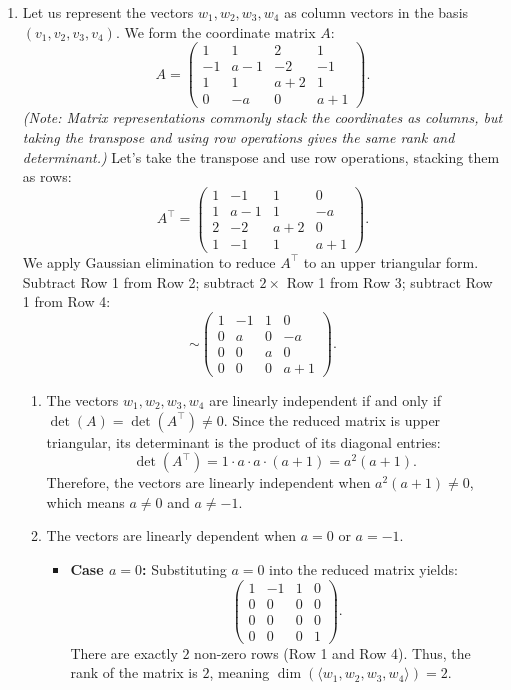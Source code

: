 \documentclass[10pt,a4paper]{article}
\begin{document}
\begin{enumerate}[label=\fbox{\arabic*}]
  \item %
        Let us represent the vectors $w_1, w_2, w_3, w_4$ as column vectors in the basis $(v_1, v_2, v_3, v_4)$. We form the coordinate matrix $A$:
        \[
          A = \begin{pmatrix} 1 & 1 & 2 & 1 \\ -1 & a-1 & -2 & -1 \\ 1 & 1 & a+2 & 1 \\ 0 & -a & 0 & a+1 \end{pmatrix}.
        \]
        \textit{(Note: Matrix representations commonly stack the coordinates as columns, but taking the transpose and using row operations gives the same rank and determinant.)} Let's take the transpose and use row operations, stacking them as rows:
        \[
          A^\top = \begin{pmatrix} 1 & -1 & 1 & 0 \\ 1 & a-1 & 1 & -a \\ 2 & -2 & a+2 & 0 \\ 1 & -1 & 1 & a+1 \end{pmatrix}.
        \]
        We apply Gaussian elimination to reduce $A^\top$ to an upper triangular form.
        Subtract Row 1 from Row 2; subtract $2 \times$ Row 1 from Row 3; subtract Row 1 from Row 4:
        \[
          \sim \begin{pmatrix} 1 & -1 & 1 & 0 \\ 0 & a & 0 & -a \\ 0 & 0 & a & 0 \\ 0 & 0 & 0 & a+1 \end{pmatrix}.
        \]
        \begin{enumerate}[label=(\arabic*)]
          \item The vectors $w_1, w_2, w_3, w_4$ are linearly independent if and only if $\det(A) = \det(A^\top) \neq 0$.
          Since the reduced matrix is upper triangular, its determinant is the product of its diagonal entries:
          \[
            \det(A^\top) = 1 \cdot a \cdot a \cdot (a+1) = a^2(a+1).
          \]
          Therefore, the vectors are linearly independent when $a^2(a+1) \neq 0$, which means $a \neq 0$ and $a \neq -1$.
          
          \item The vectors are linearly dependent when $a = 0$ or $a = -1$.
          \begin{itemize}
            \item \textbf{Case $a = 0$:} Substituting $a = 0$ into the reduced matrix yields:
            \[
              \begin{pmatrix} 1 & -1 & 1 & 0 \\ 0 & 0 & 0 & 0 \\ 0 & 0 & 0 & 0 \\ 0 & 0 & 0 & 1 \end{pmatrix}.
            \]
            There are exactly $2$ non-zero rows (Row 1 and Row 4). Thus, the rank of the matrix is $2$, meaning $\dim(\langle w_1, w_2, w_3, w_4 \rangle) = 2$.
            

\end{itemize}
\end{enumerate}
\end{enumerate}
\end{document}
